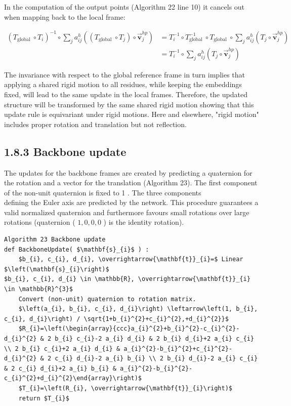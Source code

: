 \documentclass[10pt]{article}
\begin{document}
In the computation of the output points (Algorithm 22 line 10) it cancels out when mapping back to the local frame:


\begin{align*}
\left(T_{\text {global }} \circ T_{i}\right)^{-1} \circ \sum_{j} a_{i j}^{h}\left(\left(T_{\text {global }} \circ T_{j}\right) \circ \overrightarrow{\mathbf{v}}_{j}^{h p}\right) & =T_{i}^{-1} \circ T_{\text {global }}^{-1} \circ T_{\text {global }} \circ \sum_{j} a_{i j}^{h}\left(T_{j} \circ \overrightarrow{\mathbf{v}}_{j}^{h p}\right)  \tag{5}\\
& =T_{i}^{-1} \circ \sum_{j} a_{i j}^{h}\left(T_{j} \circ \overrightarrow{\mathbf{v}}_{j}^{h p}\right) \tag{6}
\end{align*}


The invariance with respect to the global reference frame in turn implies that applying a shared rigid motion to all residues, while keeping the embeddings fixed, will lead to the same update in the local frames. Therefore, the updated structure will be transformed by the same shared rigid motion showing that this update rule is equivariant under rigid motions. Here and elsewhere, "rigid motion" includes proper rotation and translation but not reflection.

\subsection*{1.8.3 Backbone update}
The updates for the backbone frames are created by predicting a quaternion for the rotation and a vector for the translation (Algorithm 23). The first component of the non-unit quaternion is fixed to 1 . The three components\\
defining the Euler axis are predicted by the network. This procedure guarantees a valid normalized quaternion and furthermore favours small rotations over large rotations (quaternion ( $1,0,0,0$ ) is the identity rotation).

\begin{verbatim}
Algorithm 23 Backbone update
def BackboneUpdate( $\mathbf{s}_{i}$ ) :
    $b_{i}, c_{i}, d_{i}, \overrightarrow{\mathbf{t}}_{i}=$ Linear $\left(\mathbf{s}_{i}\right)$
$b_{i}, c_{i}, d_{i} \in \mathbb{R}, \overrightarrow{\mathbf{t}}_{i} \in \mathbb{R}^{3}$
    Convert (non-unit) quaternion to rotation matrix.
    $\left(a_{i}, b_{i}, c_{i}, d_{i}\right) \leftarrow\left(1, b_{i}, c_{i}, d_{i}\right) / \sqrt{1+b_{i}^{2}+c_{i}^{2},+d_{i}^{2}}$
    $R_{i}=\left(\begin{array}{ccc}a_{i}^{2}+b_{i}^{2}-c_{i}^{2}-d_{i}^{2} & 2 b_{i} c_{i}-2 a_{i} d_{i} & 2 b_{i} d_{i}+2 a_{i} c_{i} \\ 2 b_{i} c_{i}+2 a_{i} d_{i} & a_{i}^{2}-b_{i}^{2}+c_{i}^{2}-d_{i}^{2} & 2 c_{i} d_{i}-2 a_{i} b_{i} \\ 2 b_{i} d_{i}-2 a_{i} c_{i} & 2 c_{i} d_{i}+2 a_{i} b_{i} & a_{i}^{2}-b_{i}^{2}-c_{i}^{2}+d_{i}^{2}\end{array}\right)$
    $T_{i}=\left(R_{i}, \overrightarrow{\mathbf{t}}_{i}\right)$
    return $T_{i}$
\end{verbatim}
\end{document}
